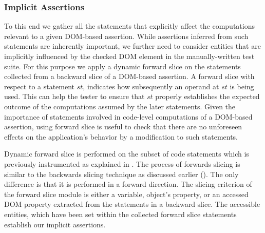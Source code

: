 \subsubsection{Implicit Assertions} \label{Sec:implicitAssertions}
To this end we gather all the statements that explicitly affect the computations relevant to a given DOM-based assertion. While assertions inferred from such statements are inherently important, we further need to consider entities that are implicitly influenced by the checked DOM element in the manually-written test suite. For this purpose we apply a dynamic forward slice on the statements collected from a backward slice of a DOM-based assertion. A forward slice with respect to a statement $st$,
indicates how subsequently an operand at $st$ is being used. This can help the tester to ensure that $st$ properly establishes the expected outcome of the computations assumed by the later statements. 
Given the importance of statements involved in code-level computations of a DOM-based assertion, using forward slice is useful to check that there are no unforeseen effects on the application's behavior by a modification to such statements. 

Dynamic forward slice is performed on the subset of code statements which is previously instrumented as explained in . The process of forwards slicing is similar to the backwards slicing technique as discussed earlier (). The only difference is that it is performed in a forward direction. The slicing criterion of the forward slice module is either a variable, object's property, or an accessed DOM property extracted from the statements in a backward slice. The accessible entities, which have been set within the collected forward slice statements establish our implicit assertions.   